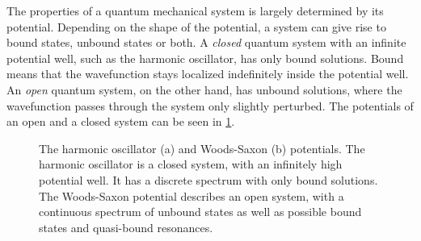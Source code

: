 The properties of a quantum mechanical system is largely determined by its potential. 
Depending on the shape of the potential, a system can give rise to bound states, unbound states or both.
A \emph{closed} quantum system with an infinite potential well, such as the harmonic oscillator, has only bound solutions. 
Bound means that the wavefunction stays localized indefinitely inside the potential well. 
An \emph{open} quantum system, on the other hand, has unbound solutions, where the wavefunction passes through the system only slightly perturbed. 
The potentials of an open and a closed system can be seen in \cref{fig:potentials}.

\begin{figure}
  \newcommand{\axes}[6]{
    \draw[->] (#2, 0) -- (#3, 0) node[right] {#1};
    \draw[->] (0, #5) -- (0, #6) node[above] {#4};
  }
  \caption{The harmonic oscillator (a) and Woods-Saxon (b) potentials. The harmonic oscillator is a closed system, with an infinitely high potential well. It has a discrete spectrum with only bound solutions. The Woods-Saxon potential describes an open system, with a continuous spectrum of unbound states as well as possible bound states and quasi-bound resonances.}
  \label{fig:potentials}
\end{figure}

